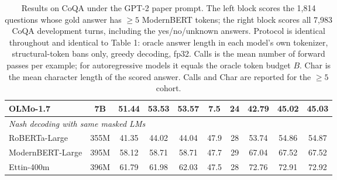 \begin{table}[t]
\begin{tabular}{lccccccccc}
OLMo-1.7 & 7B & 51.44 & 53.53 & 53.57 & 7.5 & 24 & 42.79 & 45.02 & 45.03 \\
\midrule
\multicolumn{10}{l}{\textit{Nash decoding with same masked LMs}} \\
RoBERTa-Large & 355M & 41.35 & 44.02 & 44.04 & 47.9 & 28 & 53.74 & 54.86 & 54.87 \\
ModernBERT-Large & 395M & 58.12 & 58.71 & 58.71 & 47.7 & 29 & 67.04 & 67.52 & 67.52 \\
Ettin-400m & 396M & 61.79 & 61.98 & 62.03 & 47.5 & 28 & 72.76 & 72.91 & 72.92 \\
\bottomrule
\end{tabular}
\caption{Results on CoQA under the GPT-2 paper prompt. The left block scores the 1,814 questions whose gold answer has $\geq 5$ ModernBERT tokens; the right block scores all 7,983 CoQA development turns, including the yes/no/unknown answers. Protocol is identical throughout and identical to Table 1: oracle answer length in each model's own tokenizer, structural-token bans only, greedy decoding, fp32. Calls is the mean number of forward passes per example; for autoregressive models it equals the oracle token budget $B$. Char is the mean character length of the scored answer. Calls and Char are reported for the $\geq 5$ cohort.}
\label{tab:coqa}
\end{table}
